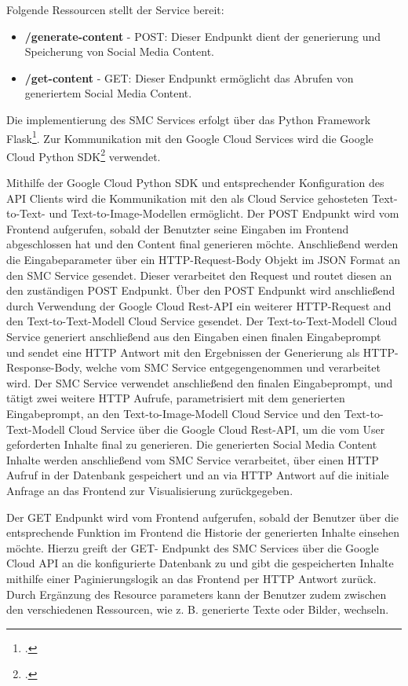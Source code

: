 Folgende Ressourcen stellt der Service bereit:
\begin{itemize}
    \item \textbf{/generate-content} - POST: Dieser Endpunkt dient der generierung und Speicherung von Social Media Content.
    \item \textbf{/get-content} - GET: Dieser Endpunkt ermöglicht das Abrufen von generiertem Social Media Content.
\end{itemize}

Die implementierung des SMC Services erfolgt über das Python Framework Flask\footcite{flask}.
Zur Kommunikation mit den Google Cloud Services wird die Google Cloud Python SDK\footcite{google_cloud_sdk} verwendet.

Mithilfe der Google Cloud Python SDK und entsprechender Konfiguration des API Clients wird die Kommunikation mit den als Cloud Service gehosteten Text-to-Text- und Text-to-Image-Modellen ermöglicht.
Der POST Endpunkt wird vom Frontend aufgerufen, sobald der Benutzter seine Eingaben im Frontend abgeschlossen hat und den Content final generieren möchte.
Anschließend werden die Eingabeparameter über ein HTTP-Request-Body Objekt im JSON Format an den SMC Service gesendet.
Dieser verarbeitet den Request und routet diesen an den zuständigen POST Endpunkt.
Über den POST Endpunkt wird anschließend durch Verwendung der Google Cloud Rest-API ein weiterer HTTP-Request and den Text-to-Text-Modell Cloud Service gesendet.
Der Text-to-Text-Modell Cloud Service generiert anschließend aus den Eingaben einen finalen Eingabeprompt und sendet eine HTTP Antwort mit den Ergebnissen der Generierung als HTTP-Response-Body, welche vom SMC Service entgegengenommen und verarbeitet wird.
Der SMC Service verwendet anschließend den finalen Eingabeprompt, und tätigt zwei weitere HTTP Aufrufe, parametrisiert mit dem generierten Eingabeprompt, an den Text-to-Image-Modell Cloud Service und den Text-to-Text-Modell Cloud Service über die Google Cloud Rest-API, um die vom User geforderten Inhalte final zu generieren.
Die generierten Social Media Content Inhalte werden anschließend vom SMC Service verarbeitet, über einen HTTP Aufruf in der Datenbank gespeichert und an via HTTP Antwort auf die initiale Anfrage an das Frontend zur Visualisierung zurückgegeben.

Der GET Endpunkt wird vom Frontend aufgerufen, sobald der Benutzer über die entsprechende Funktion im Frontend die Historie der generierten Inhalte einsehen möchte.
Hierzu greift der GET- Endpunkt des SMC Services über die Google Cloud API an die konfigurierte Datenbank zu und gibt die gespeicherten Inhalte mithilfe einer Paginierungslogik an das Frontend per HTTP Antwort zurück.
Durch Ergänzung des Resource parameters kann der Benutzer zudem zwischen den verschiedenen Ressourcen, wie z. B. generierte Texte oder Bilder, wechseln.

